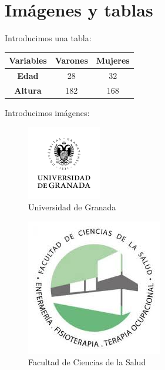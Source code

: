 \documentclass[a4paper,11pt]{article}
\begin{document}
\section{Imágenes y tablas}

Introducimos una tabla:\\

	\begin{tabular}{|c|c|c|}
		\hline
		\rowcolor[HTML]{C0C0C0} 
		\textbf{Variables} & \textbf{Varones} & \textbf{Mujeres} \\ \hline
		\textbf{Edad}      & 28               & 32               \\ \hline
		\textbf{Altura}    & 182              & 168              \\ \hline
	\end{tabular}

\vspace{0.5cm}

Introducimos imágenes:

\begin{multicols}{2}
	
	\begin{figure}[H]
		\caption{Universidad de Granada}
		\centering
		\includegraphics[width=0.5\linewidth]{ugr}
	\end{figure}

	\begin{figure}[H]
		\caption{Facultad de Ciencias de la Salud}
		\centering
		\includegraphics[width=0.5\linewidth]{fcs}
	\end{figure}

\end{multicols}
\end{document}
